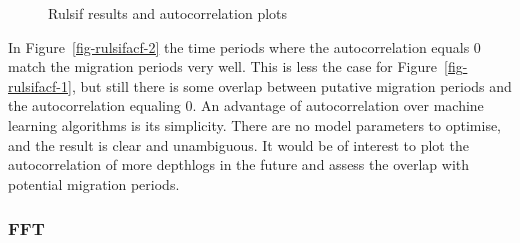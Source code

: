 \documentclass[
  authoryear,
  review,
  3p]{elsarticle}
\begin{document}
\begin{figure}

\begin{minipage}[t]{\linewidth}

{\centering 


}

\end{minipage}%
\newline
\begin{minipage}[t]{\linewidth}

{\centering 


}

\end{minipage}%

\caption{\label{fig-rulsifacf}Rulsif results and autocorrelation plots}

\end{figure}

In Figure~\ref{fig-rulsifacf-2} the time periods where the
autocorrelation equals 0 match the migration periods very well. This is
less the case for Figure~\ref{fig-rulsifacf-1}, but still there is some
overlap between putative migration periods and the autocorrelation
equaling 0. An advantage of autocorrelation over machine learning
algorithms is its simplicity. There are no model parameters to optimise,
and the result is clear and unambiguous. It would be of interest to plot
the autocorrelation of more depthlogs in the future and assess the
overlap with potential migration periods.

\hypertarget{fft}{%
\subsubsection{FFT}\label{fft}}
\end{document}
